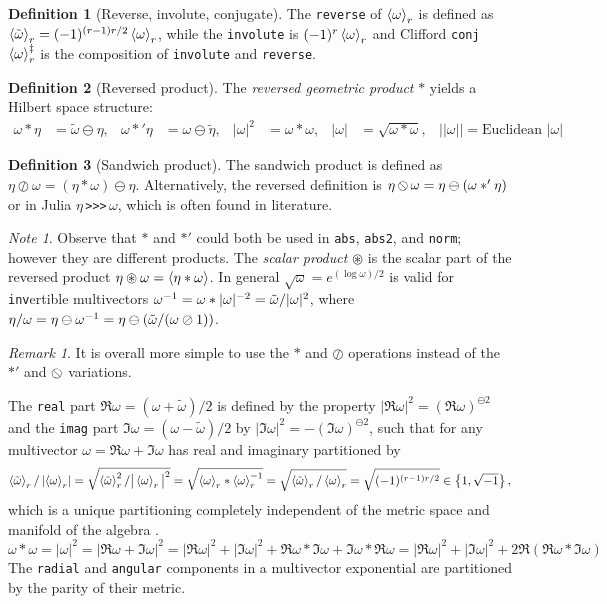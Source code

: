 \documentclass[]{article}
\theoremstyle{definition}
\newtheorem{definition}{Definition}
\theoremstyle{remark}
\newtheorem*{remark}{Remark}
\newtheorem*{note}{Note}
\DeclareMathOperator*{\obackslash}{\text{\reflectbox{$\oslash$}}}
\begin{document}
\begin{definition}[Reverse, involute, conjugate]
	The \verb`reverse` of $\left\langle \omega \right\rangle_r$ is defined as $\left\langle \tilde\omega \right\rangle_r = (-1)^{(r-1)r/2}\left\langle \omega \right\rangle_r$, while the \verb`involute` is $(-1)^r\left\langle \omega \right\rangle_r$ and Clifford \verb`conj`  $\left\langle \omega \right\rangle_r^\ddagger$ is the composition of \verb`involute` and \verb`reverse`.
\end{definition}

\begin{definition}[Reversed product]
	The \textit{reversed geometric product} $\ast$ yields a Hilbert space structure:
	\begin{align*}
		\omega\ast\eta &= \tilde\omega\ominus\eta, & \omega\ast'\eta &= \omega\ominus\tilde\eta, & |\omega|^2 &= \omega\ast\omega, & |\omega| &= \sqrt{\omega\ast\omega}, & ||\omega|| = \text{Euclidean }|\omega|
	\end{align*}
\end{definition}
\begin{definition}[Sandwich product]
	The sandwich product is defined as $\eta\oslash\omega = (\eta\ast\omega)\ominus\eta$. Alternatively, the reversed definition is $\eta\obackslash\omega = \eta\ominus(\omega\ast'\eta)$ or in Julia $\eta\,$\verb`>>>`$\,\omega$, which is often found in literature.
\end{definition}
\begin{note}
	Observe that $\ast$ and $\ast'$ could both be used in \verb`abs`, \verb`abs2`, and \verb`norm`; however they are different products.
	The \textit{scalar product} $\circledast$ is the scalar part of the reversed product $\eta\circledast\omega = \left\langle \eta\ast\omega \right\rangle$.
	In general $\sqrt\omega = e^{(\log\omega)/2}$ is valid for \verb`inv`ertible multivectors $\omega^{-1} = \omega\ast|\omega|^{-2} = \tilde\omega/|\omega|^2$, where $\eta/\omega = \eta\ominus\omega^{-1} = \eta\ominus(\tilde\omega/(\omega\oslash1))$.
\end{note}
\begin{remark}
	It is overall more simple to use the $\ast$ and $\oslash$ operations instead of the $\ast'$ and $\obackslash$ variations.
\end{remark}
The \verb`real` part $\Re\omega = (\omega+\tilde\omega)/2$ is defined by the property $|\Re\omega|^2 = (\Re\omega)^{\ominus2}$ and the \verb`imag` part $\Im\omega = (\omega-\tilde\omega)/2$ by $|\Im\omega|^2 = -(\Im\omega)^{\ominus2}$, such that for any multivector $\omega = \Re\omega+\Im\omega$ has real and imaginary partitioned by 
$$\left\langle \tilde\omega \right\rangle_r/\left|\left\langle \omega \right\rangle_r\right| = \sqrt{\left\langle \tilde\omega \right\rangle_r^2/\big|\left\langle \omega \right\rangle_r\big|^2} = \sqrt{\left\langle \omega \right\rangle_r\ast\left\langle \omega \right\rangle_r^{-1}} = \sqrt{\left\langle \tilde\omega \right\rangle_r/\left\langle \omega \right\rangle_r}=\sqrt{(-1)^{(r-1)r/2}} \in\left\{ 1,\sqrt{-1} \right\},$$
which is a unique partitioning completely independent of the metric space and manifold of the algebra \cite{chappell-iqbal-gunn-abbott}.
$$ \omega\ast\omega = |\omega|^2 = |\Re\omega+\Im\omega|^2 = |\Re\omega|^2 + |\Im\omega|^2 + \Re\omega\ast\Im\omega + \Im\omega\ast\Re\omega = |\Re\omega|^2+|\Im\omega|^2 + 2\Re(\Re\omega\ast\Im\omega) $$
The \verb`radial` and \verb`angular` components in a multivector exponential are partitioned by the parity of their metric.
\end{document}

